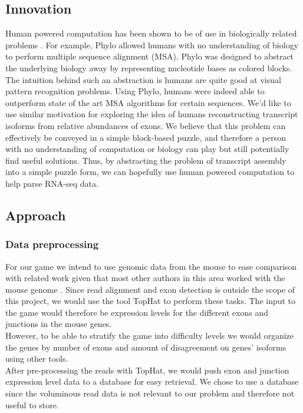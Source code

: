 \documentclass[12pt]{article}
\begin{document}
\subsection*{Innovation}
Human powered computation has been shown to be of use in biologically related problems \citep{kawrykow2012phylo, cooper2010predicting}. For example, Phylo allowed humans with no understanding of biology to perform multiple sequence alignment (MSA). Phylo was designed to abstract the underlying biology away by representing nucleotide bases as colored blocks.  The intuition behind such an abstraction is humans are quite good at visual pattern recognition problems. Using Phylo, humans were indeed able to outperform state of the art MSA algorithms for certain sequences. We'd like to use similar motivation for exploring the idea of humans reconstructing transcript isoforms from relative abundances  of exons. We believe that this problem can effectively be conveyed in a simple block-based puzzle, and therefore a person with no understanding of computation or biology can play but still potentially find useful solutions. Thus, by abstracting the problem of transcript assembly into a simple puzzle form, we can hopefully use human powered computation to help parse RNA-seq data.

\subsection*{Approach}
\subsubsection*{Data preprocessing}
For our game we intend to use genomic data from the mouse to ease comparison with related work given that most other authors in this area worked with the mouse genome \citep{trapnell2010transcript,guttman2010ab,feng2010inference,li2011isolasso}. Since read alignment and exon detection is outside the scope of this project, we would use the tool TopHat \citep{trapnell2009tophat} to perform these tasks. The input to the game would therefore be expression levels for the different exons and junctions in the mouse genes. \\
However, to be able to stratify the game into difficulty levels we would organize the genes by number of exons and amount of disagreement on genes' isoforms using other tools. \\
After pre-processing the reads with TopHat, we would push exon and junction expression level data to a database for easy retrieval. We chose to use a database since the voluminous read data is not relevant to our problem and therefore not useful to store.
\end{document}
